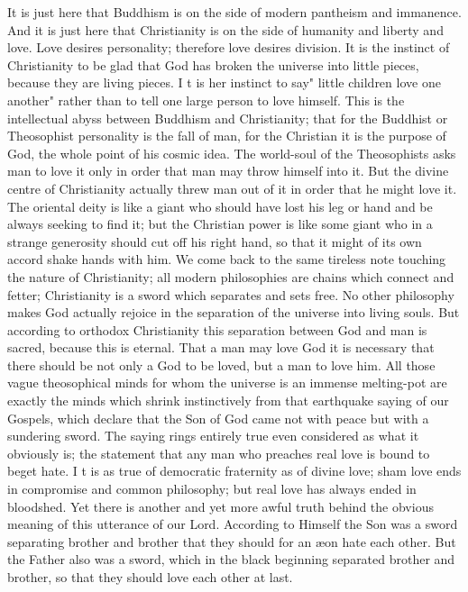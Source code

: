 \documentclass{book}
\begin{document}
It is just here that Buddhism is on the side of modern pantheism and immanence. And it is just here that Christianity is on the side of humanity and liberty and love. Love desires personality; therefore love desires division. It is the instinct of Christianity to be glad that God has broken the universe into little pieces, because they are living pieces. I t is her instinct to say" little children love one another" rather than to tell one large person to love himself. This is the intellectual abyss between Buddhism and Christianity; that for the Buddhist or Theosophist personality is the fall of man, for the Christian it is the purpose of God, the whole point of his cosmic idea. The world-soul of the Theosophists asks man to love it only in order that man may throw himself into it. But the divine centre of Christianity actually threw man out of it in order that he might love it. The oriental deity is like a giant who should have lost his leg or hand and be always seeking to find it; but the Christian power is like some giant who in a strange generosity should cut off his right hand, so that it might of its own accord shake hands with him. We come back to the same tireless note touching the nature of Christianity; all modern philosophies are chains which connect and fetter; Christianity is a sword which separates and sets free. No other philosophy makes God actually rejoice in the separation of the universe into living souls. But according to orthodox Christianity this separation between God and man is sacred, because this is eternal. That a man may love God it is necessary that there should be not only a God to be loved, but a man to love him. All those vague theosophical minds for whom the universe is an immense melting-pot are exactly the minds which shrink instinctively from that earthquake saying of our Gospels, which declare that the Son of God came not with peace but with a sundering sword. The saying rings entirely true even considered as what it obviously is; the statement that any man who preaches real love is bound to beget hate. I t is as true of democratic fraternity as of divine love; sham love ends in compromise and common philosophy; but real love has always ended in bloodshed. Yet there is another and yet more awful truth behind the obvious meaning of this utterance of our Lord. According to Himself the Son was a sword separating brother and brother that they should for an æon hate each other. But the Father also was a sword, which in the black beginning separated brother and brother, so that they should love each other at last.
\end{document}
